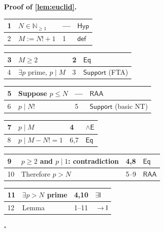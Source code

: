 \documentclass[11pt,reqno]{amsart}
\theoremstyle{blueplain}
\renewcommand{\qedsymbol}{\textcolor{proofqed}{\ensuremath{\square}}}
\renewenvironment{proof}[1][Proof]{\par\noindent\textbf{\textcolor{proofhead}{#1.}}\par\nobreak}{\par\nobreak\hfill\qedsymbol}
\numberwithin{equation}{section}
\begin{document}
\begin{proof}[\textbf{Proof of \cref{lem:euclid}}]
	\label{proof:lem:euclid}
	{\scriptsize
		\begin{tabular}{|m{0.7cm}|m{12cm}|m{1.4cm}|m{2.5cm}|}
			\hline
			1 & $N\in\mathbb{N}_{\geq 1}$ & --- & $\mathsf{Hyp}$ \\ \hline
			2 & $M:=N!+1$ & 1 & $\mathsf{def}$ \\
		\end{tabular}%
		\noindent \newline
		\noindent
		\begin{tabular}{|m{0.7cm}|m{12cm}|m{1.4cm}|m{2.5cm}|}
			\hline
			3 & $M\ge 2$ & 2 & $\mathsf{Eq}$ \\ \hline
			4 & $\exists p$ prime, $p\mid M$ & 3 & $\mathsf{Support}$ (FTA) \\
		\end{tabular}%
		\noindent \newline
		\noindent
		\begin{tabular}{|m{0.7cm}|m{12cm}|m{1.4cm}|m{2.5cm}|}
			\hline
			5 & Suppose $p\le N$ & --- & $\mathsf{RAA}$ \\ \hline
			6 & $p\mid N!$ & 5 & $\mathsf{Support}$ (basic NT) \\
		\end{tabular}%
		\noindent \newline
		\noindent
		\begin{tabular}{|m{0.7cm}|m{12cm}|m{1.4cm}|m{2.5cm}|}
			\hline
			7 & $p\mid M$ & 4 & $\wedge\mathsf{E}$ \\ \hline
			8 & $p\mid M-N!=1$ & 6,7 & $\mathsf{Eq}$ \\
		\end{tabular}%
		\noindent \newline
		\noindent
		\begin{tabular}{|m{0.7cm}|m{12cm}|m{1.4cm}|m{2.5cm}|}
			\hline
			9 & $p\ge 2$ and $p\mid 1$: contradiction & 4,8 & $\mathsf{Eq}$ \\ \hline
			10 & Therefore $p>N$ & 5--9 & $\mathsf{RAA}$ \\
		\end{tabular}%
		\noindent \newline
		\noindent
		\begin{tabular}{|m{0.7cm}|m{12cm}|m{1.4cm}|m{2.5cm}|}
			\hline
			11 & $\exists p>N$ prime & 4,10 & $\exists\mathsf{I}$ \\ \hline
			12 & Lemma & 1--11 & $\rightarrow\mathsf{I}$ \\ \hline
		\end{tabular}%
	}
\end{proof}
\end{document}
